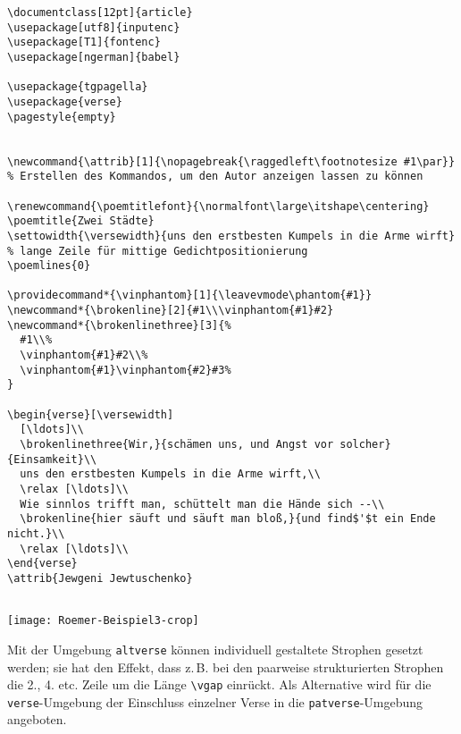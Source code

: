 \begin{lstlisting}
\documentclass[12pt]{article}
\usepackage[utf8]{inputenc}
\usepackage[T1]{fontenc}
\usepackage[ngerman]{babel}

\usepackage{tgpagella}
\usepackage{verse}
\pagestyle{empty}


\newcommand{\attrib}[1]{\nopagebreak{\raggedleft\footnotesize #1\par}}
% Erstellen des Kommandos, um den Autor anzeigen lassen zu können

\renewcommand{\poemtitlefont}{\normalfont\large\itshape\centering}
\poemtitle{Zwei Städte}
\settowidth{\versewidth}{uns den erstbesten Kumpels in die Arme wirft}
% lange Zeile für mittige Gedichtpositionierung
\poemlines{0}

\providecommand*{\vinphantom}[1]{\leavevmode\phantom{#1}}
\newcommand*{\brokenline}[2]{#1\\\vinphantom{#1}#2}
\newcommand*{\brokenlinethree}[3]{%
  #1\\%
  \vinphantom{#1}#2\\%
  \vinphantom{#1}\vinphantom{#2}#3%
}

\begin{verse}[\versewidth]
  [\ldots]\\ 
  \brokenlinethree{Wir,}{schämen uns, und Angst vor solcher}{Einsamkeit}\\
  uns den erstbesten Kumpels in die Arme wirft,\\
  \relax [\ldots]\\
  Wie sinnlos trifft man, schüttelt man die Hände sich --\\
  \brokenline{hier säuft und säuft man bloß,}{und find$'$t ein Ende nicht.}\\
  \relax [\ldots]\\
\end{verse}
\attrib{Jewgeni Jewtuschenko}


\end{lstlisting}

\begin{center}
\texttt{[image: Roemer-Beispiel3-crop]}
\end{center}

Mit der Umgebung \texttt{altverse} können individuell gestaltete Strophen gesetzt werden; sie hat den Effekt, dass z.\,B. bei den paarweise 
strukturierten
Strophen die 2., 4. etc. Zeile um die Länge \verb|\vgap| einrückt.
Als Alternative wird für die \texttt{verse}-Umgebung der Einschluss einzelner
Verse in die \texttt{patverse}-Umgebung angeboten.

